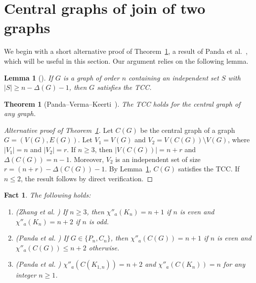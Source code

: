 \documentclass[12pt,reqno,a4paper]{amsart}
\theoremstyle{definition}
\theoremstyle{plain}
\newtheorem{thm}[defn]{Theorem}
\newtheorem{lem}[defn]{Lemma}
\newtheorem{fact}[defn]{Fact}
\begin{document}
\section{Central graphs of join of two graphs}

We begin with a short alternative proof of Theorem~\ref{Theorem 5.2}, a result of Panda et al.~\cite{PVK2020}, which will be useful in this section.
Our argument relies on the following lemma.

\begin{lem}[{\cite[Lemma 2.4]{YC1992}}]\label{Lemma 5.1}
If $G$ is a graph of order $n$ containing an independent set $S$ with $|S| \geq n - \Delta(G) - 1$, then $G$ satisfies the TCC.
\end{lem}

\begin{thm}[Panda--Verma--Keerti~\cite{PVK2020}]\label{Theorem 5.2}
The TCC holds for the central graph of any graph.
\end{thm}

\begin{proof}[Alternative proof of Theorem~\ref{Theorem 5.2}]
Let $C(G)$ be the central graph of a graph $G=(V(G),E(G))$. Let $V_1 = V(G)$ and $V_2 = V(C(G)) \setminus V(G)$, where $|V_1| = n$ and $|V_2| = r$. 
If $n \geq 3$, then $|V(C(G))| = n + r$ and $\Delta(C(G)) = n - 1$. Moreover, $V_2$ is an independent set of size
$
r = (n + r) - \Delta(C(G)) - 1.
$
By Lemma~\ref{Lemma 5.1}, $C(G)$ satisfies the TCC.
If $n \leq 2$, the result follows by direct verification.
\end{proof}

\begin{fact}\label{Fact 5.3}
The following holds:

\begin{enumerate}
    \item {(Zhang et al. \cite[Theorem 2.2]{ZCYLW2005})} If $n\geq3$, then $\chi''_{a}(K_n)=n+1$ if $n$ is even and $\chi''_{a}(K_n)=n+2$ if $n$ is odd.
    
    \item {(Panda et al. \cite[Theorems 4.1, 4.2]{PVK2020})} If $G\in \{P_{n}, C_{n}\}$, then $\chi''_{a}(C(G))=n+1$ if $n$ is even and $\chi''_{a}(C(G))\leq n+2$ otherwise.

   \item {(Panda et al. \cite[Theorems 4.3, 4.4]{PVK2020})} $\chi''_{a}(C(K_{1,n}))=n+2$ and $\chi''_{a}(C(K_{n}))=n$ for any integer $n\geq 1$.
\end{enumerate}
\end{fact}
\end{document}
